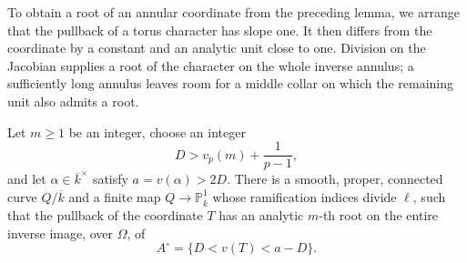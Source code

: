 To obtain a root of an annular coordinate from the preceding lemma,
we arrange that the pullback of a torus character has slope one.
It then differs from the coordinate by a constant and an analytic unit
close to one.  Division on the Jacobian supplies a root of the character
on the whole inverse annulus; a sufficiently long annulus leaves room
for a middle collar on which the remaining unit also admits a root.

\begin{proposition}\label{prop:arbitrary-roots}
Let $m\ge1$ be an integer, choose an integer
\[
 D>v_p(m)+\frac1{p-1},
\]
and let $\alpha\in\overline{k}^{\times}$ satisfy $a=v(\alpha)>2D$.
There is a smooth, proper, connected curve $Q/\overline{k}$ and a finite
map $Q\to\mathbb P^1_{\overline{k}}$ whose ramification indices divide
$\ell$, such that the pullback of the coordinate $T$ has an analytic
$m$-th root on the entire inverse image, over $\Omega$, of
\[
 A^\circ=\{D<v(T)<a-D\}.
\]
\end{proposition}

